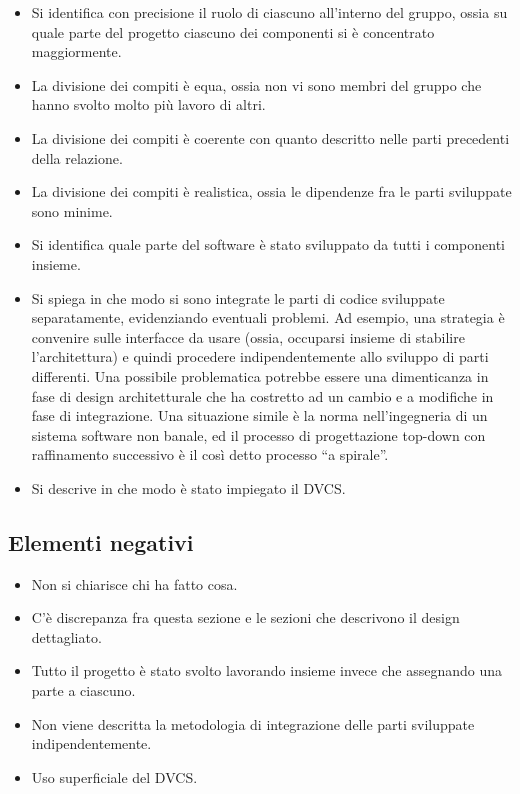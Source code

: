 \documentclass[a4paper,12pt]{report}
\begin{document}
\begin{itemize}
	\item Si identifica con precisione il ruolo di ciascuno all'interno del gruppo, ossia su quale parte del progetto ciascuno dei componenti si è concentrato maggiormente.
	\item La divisione dei compiti è equa, ossia non vi sono membri del gruppo che hanno svolto molto più lavoro di altri.
	\item La divisione dei compiti è coerente con quanto descritto nelle parti precedenti della relazione.
	\item La divisione dei compiti è realistica, ossia le dipendenze fra le parti sviluppate sono minime.
	\item Si identifica quale parte del software è stato sviluppato da tutti i componenti insieme.
	\item Si spiega in che modo si sono integrate le parti di codice sviluppate separatamente, evidenziando eventuali problemi. Ad esempio, una strategia è convenire sulle interfacce da usare (ossia, occuparsi insieme di stabilire l'architettura) e quindi procedere indipendentemente allo sviluppo di parti differenti. Una possibile problematica potrebbe essere una dimenticanza in fase di design architetturale che ha costretto ad un cambio e a modifiche in fase di integrazione. Una situazione simile è la norma nell'ingegneria di un sistema software non banale, ed il processo di progettazione top-down con raffinamento successivo è il così detto processo ``a spirale''.
	\item Si descrive in che modo è stato impiegato il DVCS.
\end{itemize}

\subsection*{Elementi negativi}
\begin{itemize}
	\item Non si chiarisce chi ha fatto cosa.
	\item C'è discrepanza fra questa sezione e le sezioni che descrivono il design dettagliato.
	\item Tutto il progetto è stato svolto lavorando insieme invece che assegnando una parte a ciascuno.
	\item Non viene descritta la metodologia di integrazione delle parti sviluppate indipendentemente.
	\item Uso superficiale del DVCS.
\end{itemize}
\end{document}

